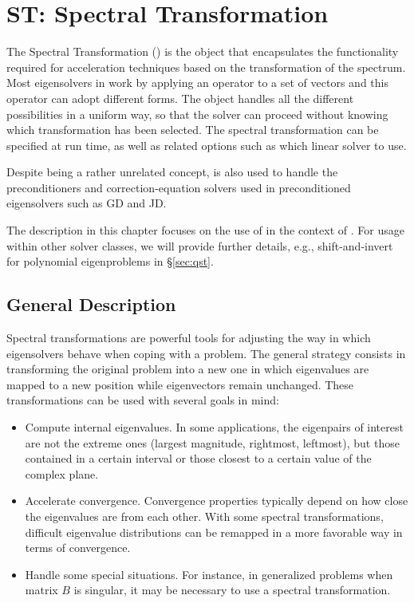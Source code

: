 \chapter{\label{cap:st}ST: Spectral Transformation}

\noindent The Spectral Transformation () is the object that encapsulates the functionality required for acceleration techniques based on the transformation of the spectrum. Most eigensolvers in  work by applying an operator to a set of vectors and this operator can adopt different forms. The  object handles all the different possibilities in a uniform way, so that the solver can proceed without knowing which transformation has been selected. The spectral transformation can be specified at run time, as well as related options such as which linear solver to use.

	Despite being a rather unrelated concept,  is also used to handle the preconditioners and correction-equation solvers used in preconditioned eigensolvers such as GD and JD.

	The description in this chapter focuses on the use of  in the context of . For usage within other solver classes, we will provide further details, e.g., shift-and-invert for polynomial eigenproblems in \S\ref{sec:qst}.

\section{General Description}

	Spectral transformations are powerful tools for adjusting the way in which eigensolvers behave when coping with a problem. The general strategy consists in transforming the original problem into a new one in which eigenvalues are mapped to a new position while eigenvectors remain unchanged. These transformations can be used with several goals in mind:
\begin{itemize}
\setlength{\itemsep}{-2pt}
\item Compute internal eigenvalues. In some applications, the eigenpairs of interest are not the extreme ones (largest magnitude, rightmost, leftmost), but those contained in a certain interval or those closest to a certain value of the complex plane.
\item Accelerate convergence. Convergence properties typically depend on how close the eigenvalues are from each other. With some spectral transformations, difficult eigenvalue distributions can be remapped in a more favorable way in terms of convergence.
\item Handle some special situations. For instance, in generalized problems when matrix $B$ is singular, it may be necessary to use a spectral transformation.
\end{itemize}
	
